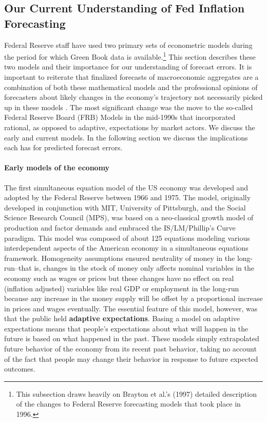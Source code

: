 \documentclass[a4paper]{article}\usepackage{graphicx, color}
\begin{document}
\subsection{Our Current Understanding of Fed Inflation Forecasting}

Federal Reserve staff have used two primary sets of econometric models during the period for which Green Book data is available.\footnote{This subsection draws heavily on Brayton et al.'s\cite{Brayton1997} (1997) detailed description of the changes to Federal Reserve forecasting models that took place in 1996.} This section describes these two models and their importance for our understanding of forecast errors. It is important to reiterate that finalized forecasts of macroeconomic aggregates are a combination of both these mathematical models and the professional opinions of forecasters about likely changes in the economy's trajectory not necessarily picked up in these models \citep{Karamouzis1989,Reifschneider1997,Taylor1997}. The most significant change was the move to the so-called Federal Reserve Board (FRB) Models in the mid-1990s that incorporated rational, as opposed to adaptive, expectations by market actors. We discuss the early and current models. In the following section we discuss the implications each has for predicted forecast errors.

\paragraph{Early models of the economy}
The first simultaneous equation model of the US economy was developed and adopted by the Federal Reserve between 1966 and 1975. The model, originally developed in conjunction with MIT, University of Pittsburgh, and the Social Science Research Council (MPS), was based on a neo-classical growth model of production and factor demands and embraced the IS/LM/Phillip's Curve paradigm. This model was composed of about 125 equations modeling various interdependent aspects of the American economy in a simultaneous equations framework. Homogeneity assumptions ensured neutrality of money in the long-run--that is, changes in the stock of money only affects nominal variables in the economy such as wages or prices but these changes have no effect on real (inflation adjusted) variables like real GDP or employment in the long-run because any increase in the money supply will be offset by a proportional increase in prices and wages eventually. The essential feature of this model, however, was that the public held {\bf{adaptive expectations}}. Basing a model on adaptive expectations means that people's expectations about what will happen in the future is based on what happened in the past. These models simply extrapolated future behavior of the economy from its recent past behavior, taking no account of the fact that people may change their behavior in response to future expected outcomes.
\end{document}
